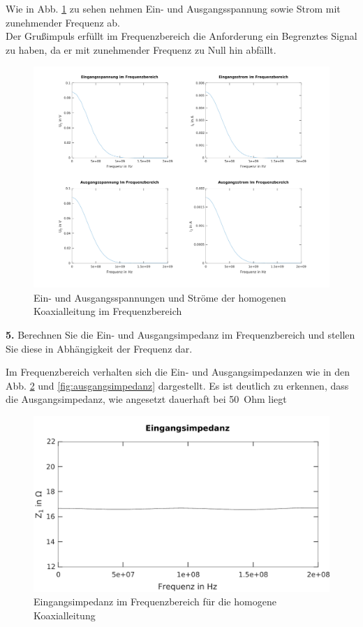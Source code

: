 \documentclass[Protokollheft.tex]{subfiles}
\begin{document}
\noindent
Wie in Abb. \ref{fig:einausspanstromfrequenz} zu sehen nehmen Ein- und Ausgangsspannung sowie Strom mit zunehmender Frequenz ab. \\
Der Grußimpuls erfüllt im Frequenzbereich die Anforderung ein Begrenztes Signal zu haben, da er mit zunehmender Frequenz zu Null hin abfällt. 
\begin{figure}
	\centering
	\includegraphics[width=0.9\linewidth]{EinAusSpanStromFrequenz}
	\caption{Ein- und Ausgangsspannungen  und Ströme der homogenen Koaxialleitung im Frequenzbereich}
	\label{fig:einausspanstromfrequenz}
\end{figure}

\begin{framed}
	\noindent \textbf{5.} Berechnen Sie die Ein- und Ausgangsimpedanz im Frequenzbereich und stellen 
Sie diese in Abhängigkeit der Frequenz dar.\label{exer:ZfreqDomain}
\end{framed}
\noindent
Im Frequenzbereich verhalten sich die Ein- und Ausgangsimpedanzen wie in den Abb. \ref{fig:eingangsimpedanz} und \ref{fig:ausgangsimpedanz} dargestellt. Es ist deutlich zu erkennen, dass die Ausgangsimpedanz, wie angesetzt dauerhaft bei 50\, Ohm liegt
\begin{figure}
	\centering
	\includegraphics[width=0.7\linewidth]{Eingangsimpedanz}
	\caption{Eingangsimpedanz im Frequenzbereich für die homogene Koaxialleitung}
	\label{fig:eingangsimpedanz}
\end{figure}
\end{document}
